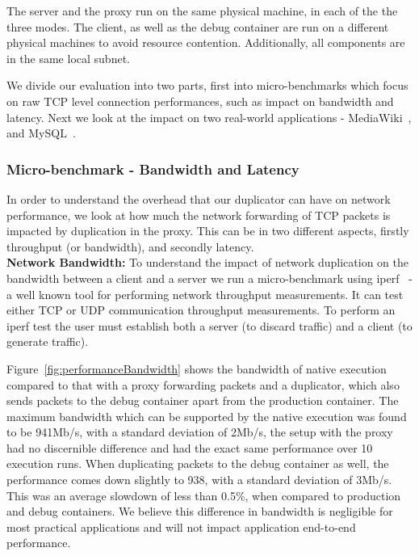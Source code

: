 The server and the proxy run on the same physical machine, in each of the the three modes.
The client, as well as the debug container are run on a different physical machines to avoid resource contention.
Additionally, all components are in the same local subnet.

We divide our evaluation into two parts, first into micro-benchmarks which focus on raw TCP level connection performances, such as impact on bandwidth and latency. Next we look at the impact on two real-world applications - MediaWiki~\cite{mediawiki}, and MySQL~\cite{mysql}.

\subsubsection{Micro-benchmark - Bandwidth and Latency}
\label{sec:microBenchBandwidthLatency}

In order to understand the overhead that our duplicator can have on network performance, we look at how much the network forwarding of TCP packets is impacted by duplication in the proxy. 
This can be in two different aspects, firstly throughput (or bandwidth), and secondly latency.\\


\noindent\textbf{Network Bandwidth:}
To understand the impact of network duplication on the bandwidth between a client and a server we run a micro-benchmark using iperf~\cite{iperf} - a well known tool for performing network throughput measurements. It can test either TCP or UDP communication throughput measurements. 
To perform an iperf test  the  user must establish both a server (to discard traffic) and a client (to generate traffic).

 Figure~\ref{fig:performanceBandwidth} shows the bandwidth of native execution compared to that with a proxy forwarding packets and a duplicator, which also sends packets to the debug container apart from the production container. 
The maximum bandwidth which can be supported by the native execution was found to be 941Mb/s, with a standard deviation of 2Mb/s, the setup with the proxy had no discernible difference and had the exact same performance over 10 execution runs. 
When duplicating packets to the debug container as well, the performance comes down slightly to 938, with a standard deviation of 3Mb/s. 
This was an average slowdown of less than 0.5\%, when compared to production and debug containers. 
We believe this difference in bandwidth is negligible for most practical applications and will not impact application end-to-end performance. \\

